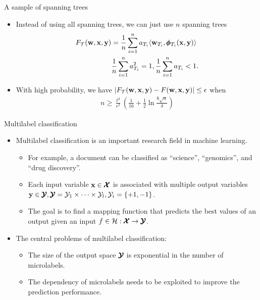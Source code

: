 \documentclass[first=dgreen,second=purple,logo=yellowexc]{aaltoslides}
\begin{document}
\begin{frame}{A sample of spanning trees}
	\begin{itemize}
		\item Instead of using all spanning trees, we can just use $n$ spanning trees
		\begin{align*}
			F_{\mathcal{T}}(\mathbf {w},\mathbf {x},\mathbf {y}) &= \frac{1}{n}\sum_{i=1}^{n}a_{T_i}\langle \mathbf {w}_{T_i}, \pmb \phi_{T_i}(\mathbf {x},\mathbf {y}) \rangle\\
			  &\frac{1}{n}\sum_{i=1}^{n}a_{T_i}^2=1,  \frac{1}{n}\sum_{i=1}^{n}a_{T_i}<1.
		\end{align*}
		\item With high probability, we have $|F_{\mathcal{T}}(\mathbf {w},\mathbf {x},\mathbf {y})-F(\mathbf {w},\mathbf {x},\mathbf {y})|\le\epsilon$ when
		\begin{align*}
			n\ge\frac{\ell^2}{\epsilon^2}(\frac{1}{16}+\frac{1}{2}\ln\frac{8\sqrt{n}}{\delta})
		\end{align*}
	\end{itemize}
\end{frame}



%
\begin{frame}{Multilabel classification}
	\begin{itemize}\footnotesize
		\item Multilabel classification is an important research field in machine learning.
		\begin{itemize}\footnotesize
			\item For example, a document can be classified as ``science'', ``genomics'', and ``drug discovery''.
			\item Each input variable $\mathbf {x}\in\pmb {\mathcal{X}}$ is associated with multiple output variables $\mathbf {y}\in\pmb {\mathcal{Y}},\pmb {\mathcal{Y}}=\mathcal{Y}_1\times\cdots\times\mathcal{Y}_l,\mathcal{Y}_i=\{+1,-1\}$.
			\item The goal is to find a mapping function that predicts the best values of an output given an input $f\in\mathcal{H}:\pmb {\mathcal{X}}\rightarrow\pmb {\mathcal{Y}}$.
		\end{itemize}
		\item The central problems of multilabel classification:
		\begin{itemize}\footnotesize
			\item The size of the output space $\pmb {\mathcal{Y}}$ is exponential in the number of microlabels.
			\item The dependency of microlabels needs to be exploited to improve the prediction performance.
		\end{itemize}
	\end{itemize}
\end{frame}
\end{document}
